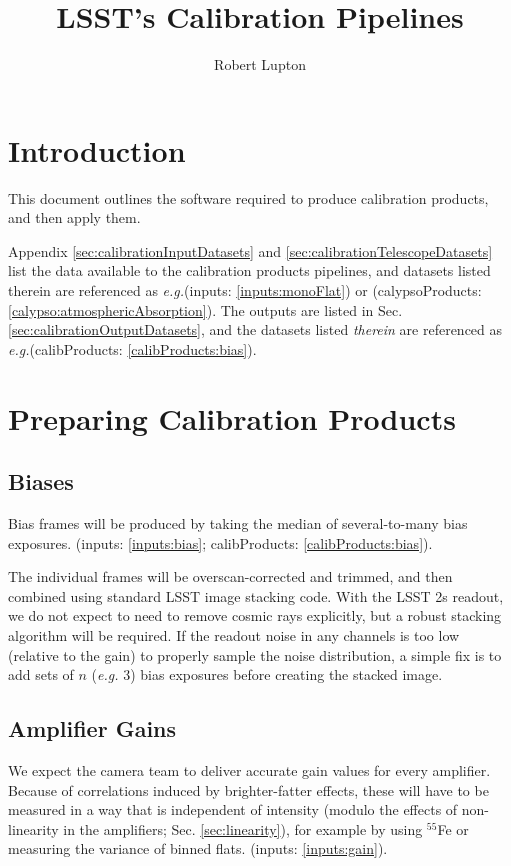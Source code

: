 \documentclass[12pt]{article}
\newcommand{\eg}{\textit{e.g.}\xspace}
\newcommand{\inputData}[1]{(inputs: \ref{inputs:#1})}
\newcommand{\outputData}[1]{(calibProducts: \ref{calibProducts:#1})}
\newcommand{\inputOutputData}[1]{(inputs: \ref{inputs:#1}; calibProducts: \ref{calibProducts:#1})}
\newcommand{\calypsoData}[1]{(calypsoProducts: \ref{calypso:#1})}
\newcommand{\secRef}[1]{Sec. \ref{sec:#1}}
\begin{document}
\title{LSST's Calibration Pipelines}
\author{Robert Lupton}
\maketitle
\tableofcontents

\section{Introduction}

This document outlines the software required to produce calibration products, and then apply them.

Appendix \ref{sec:calibrationInputDatasets} and \ref{sec:calibrationTelescopeDatasets} list the data available
to the calibration products pipelines, and datasets listed therein are referenced as \eg \inputData{monoFlat}
or \calypsoData{atmosphericAbsorption}.  The outputs are listed in \secRef{calibrationOutputDatasets}, and the
datasets listed \textit{therein} are referenced as \eg \outputData{bias}.

\section{Preparing Calibration Products}

\subsection{Biases}

Bias frames will be produced by taking the median of several-to-many bias exposures.
\inputOutputData{bias}.

The individual frames will be overscan-corrected and trimmed, and then combined using standard LSST image
stacking code.  With the LSST 2s readout, we do not expect to need to remove cosmic rays explicitly, but a
robust stacking algorithm will be required.  If the readout noise in any channels is too low (relative to the
gain) to properly sample the noise distribution, a simple fix is to add sets of $n$ (\eg 3) bias exposures
before creating the stacked image.

\subsection{Amplifier Gains}
\label{sec:gains}

We expect the camera team to deliver accurate gain values for every amplifier.  Because of
correlations induced by brighter-fatter effects, these will have to be measured in a way that is independent
of intensity (modulo the effects of non-linearity in the amplifiers; \secRef{linearity}), for example
by using $^{55}$Fe or measuring the variance of binned flats. \inputData{gain}.
\end{document}
